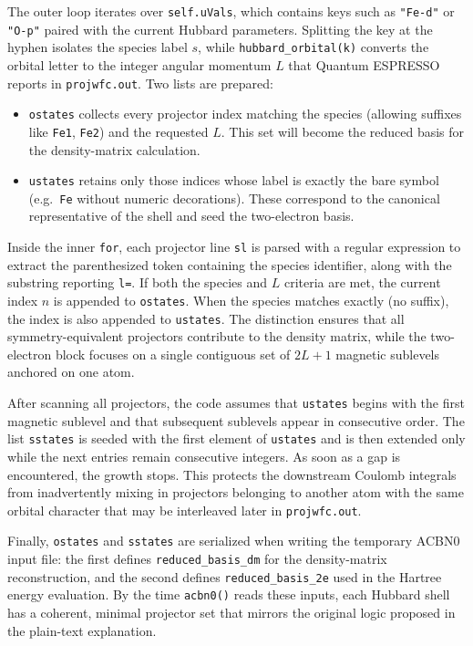 \documentclass[11pt]{article}
\begin{document}
The outer loop iterates over \texttt{self.uVals}, which contains keys such as \texttt{"Fe-d"} or \texttt{"O-p"} paired with the current Hubbard parameters. Splitting the key at the hyphen isolates the species label \(s\), while \texttt{hubbard\_orbital(k)} converts the orbital letter to the integer angular momentum \(L\) that Quantum ESPRESSO reports in \texttt{projwfc.out}. Two lists are prepared:
\begin{itemize}
  \item \texttt{ostates} collects every projector index matching the species (allowing suffixes like \texttt{Fe1}, \texttt{Fe2}) and the requested \(L\). This set will become the reduced basis for the density-matrix calculation.
  \item \texttt{ustates} retains only those indices whose label is exactly the bare symbol (e.g.\ \texttt{Fe} without numeric decorations). These correspond to the canonical representative of the shell and seed the two-electron basis.
\end{itemize}

Inside the inner \texttt{for}, each projector line \texttt{sl} is parsed with a regular expression to extract the parenthesized token containing the species identifier, along with the substring reporting \verb|l=|. If both the species and \(L\) criteria are met, the current index \(n\) is appended to \texttt{ostates}. When the species matches exactly (no suffix), the index is also appended to \texttt{ustates}. The distinction ensures that all symmetry-equivalent projectors contribute to the density matrix, while the two-electron block focuses on a single contiguous set of \(2L+1\) magnetic sublevels anchored on one atom.

After scanning all projectors, the code assumes that \texttt{ustates} begins with the first magnetic sublevel and that subsequent sublevels appear in consecutive order. The list \texttt{sstates} is seeded with the first element of \texttt{ustates} and is then extended only while the next entries remain consecutive integers. As soon as a gap is encountered, the growth stops. This protects the downstream Coulomb integrals from inadvertently mixing in projectors belonging to another atom with the same orbital character that may be interleaved later in \texttt{projwfc.out}.

Finally, \texttt{ostates} and \texttt{sstates} are serialized when writing the temporary ACBN0 input file: the first defines \verb|reduced_basis_dm| for the density-matrix reconstruction, and the second defines \verb|reduced_basis_2e| used in the Hartree energy evaluation. By the time \texttt{acbn0()} reads these inputs, each Hubbard shell has a coherent, minimal projector set that mirrors the original logic proposed in the plain-text explanation.
\end{document}
